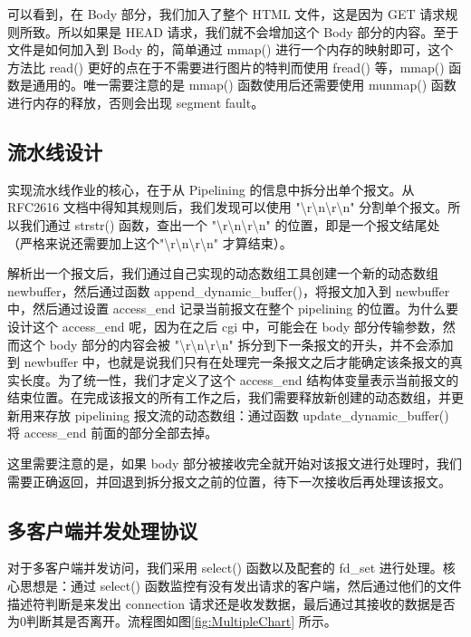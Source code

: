 可以看到，在 Body 部分，我们加入了整个 HTML 文件，这是因为 GET 请求规则所致。所以如果是 HEAD 请求，我们就不会增加这个 Body 部分的内容。至于文件是如何加入到 Body 的，简单通过 mmap() 进行一个内存的映射即可，这个方法比 read() 更好的点在于不需要进行图片的特判而使用 fread() 等，mmap() 函数是通用的。唯一需要注意的是 mmap() 函数使用后还需要使用 munmap() 函数进行内存的释放，否则会出现 segment fault。


\subsection{流水线设计}

实现流水线作业的核心，在于从 Pipelining 的信息中拆分出单个报文。从 RFC2616 文档中得知其规则后，我们发现可以使用 "\textbackslash r\textbackslash n\textbackslash r\textbackslash n" 分割单个报文。所以我们通过 strstr() 函数，查出一个 "\textbackslash r\textbackslash n\textbackslash r\textbackslash n" 的位置，即是一个报文结尾处（严格来说还需要加上这个"\textbackslash r\textbackslash n\textbackslash r\textbackslash n" 才算结束）。

解析出一个报文后，我们通过自己实现的动态数组工具创建一个新的动态数组 newbuffer，然后通过函数 append\_dynamic\_buffer()，将报文加入到 newbuffer 中，然后通过设置 access\_end 记录当前报文在整个 pipelining 的位置。为什么要设计这个 access\_end 呢，因为在之后 cgi 中，可能会在 body 部分传输参数，然而这个 body 部分的内容会被 "\textbackslash r\textbackslash n\textbackslash r\textbackslash n" 拆分到下一条报文的开头，并不会添加到 newbuffer 中，也就是说我们只有在处理完一条报文之后才能确定该条报文的真实长度。为了统一性，我们才定义了这个 access\_end 结构体变量表示当前报文的结束位置。在完成该报文的所有工作之后，我们需要释放新创建的动态数组，并更新用来存放 pipelining 报文流的动态数组：通过函数 update\_dynamic\_buffer() 将 access\_end 前面的部分全部去掉。

这里需要注意的是，如果 body 部分被接收完全就开始对该报文进行处理时，我们需要正确返回，并回退到拆分报文之前的位置，待下一次接收后再处理该报文。


\subsection{多客户端并发处理协议}

对于多客户端并发访问，我们采用 select() 函数以及配套的 fd\_set 进行处理。核心思想是：通过 select() 函数监控有没有发出请求的客户端，然后通过他们的文件描述符判断是来发出 connection 请求还是收发数据，最后通过其接收的数据是否为0判断其是否离开。流程图如图\ref{fig:MultipleChart} 所示。

